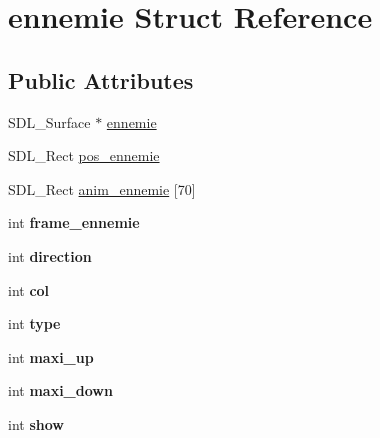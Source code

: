 \hypertarget{structennemie}{}\section{ennemie Struct Reference}
\label{structennemie}
\subsection*{Public Attributes}
\begin{DoxyCompactItemize}
\item 
S\+D\+L\+\_\+\+Surface $\ast$ \hyperlink{structennemie_aaae66281b643eb7d3ff0ecb277b750f8}{ennemie}
\item 
S\+D\+L\+\_\+\+Rect \hyperlink{structennemie_a980be16769437d4adaa8be28e8ff922d}{pos\+\_\+ennemie}
\item 
S\+D\+L\+\_\+\+Rect \hyperlink{structennemie_a662163dc7523a33432e465adf956f59d}{anim\+\_\+ennemie} \mbox{[}70\mbox{]}
\item 
int {\bfseries frame\+\_\+ennemie}\hypertarget{structennemie_a6c64fef0b6b9b6845cbc46d6d740a48d}{}\label{structennemie_a6c64fef0b6b9b6845cbc46d6d740a48d}

\item 
int {\bfseries direction}\hypertarget{structennemie_a995b8b061592608117ccc3a0ee93feff}{}\label{structennemie_a995b8b061592608117ccc3a0ee93feff}

\item 
int {\bfseries col}\hypertarget{structennemie_ad99fb2a5c0244884eaea74563fd775bb}{}\label{structennemie_ad99fb2a5c0244884eaea74563fd775bb}

\item 
int {\bfseries type}\hypertarget{structennemie_adb13bd526da54bcc4fbf88171f35f8f9}{}\label{structennemie_adb13bd526da54bcc4fbf88171f35f8f9}

\item 
int {\bfseries maxi\+\_\+up}\hypertarget{structennemie_a2b4716cc7874c9b2f74e3175a5c33f80}{}\label{structennemie_a2b4716cc7874c9b2f74e3175a5c33f80}

\item 
int {\bfseries maxi\+\_\+down}\hypertarget{structennemie_a49d19cab262c4e1f527a8b514f4aa07c}{}\label{structennemie_a49d19cab262c4e1f527a8b514f4aa07c}

\item 
int {\bfseries show}\hypertarget{structennemie_a4510cd4086e2aacff44b6cfff0b25da1}{}\label{structennemie_a4510cd4086e2aacff44b6cfff0b25da1}

\end{DoxyCompactItemize}


